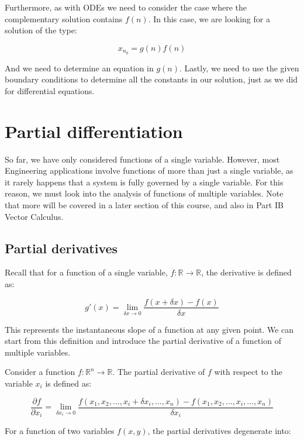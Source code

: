 \documentclass[12pt]{article}
\begin{document}
Furthermore, as with ODEs we need to consider the case where the complementary solution contains $f(n)$. In this case, we are looking for a solution of the type:

\[ x_{n_0} = g(n)f(n) \]

And we need to determine an equation in $g(n)$. Lastly, we need to use the given boundary conditions to determine all the constants in our solution, just as we did for differential equations.

\newpage

\section{Partial differentiation}

So far, we have only considered functions of a single variable. However, most Engineering applications involve functions of more than just a single variable, as it rarely happens that a system is fully governed by a single variable. For this reason, we must look into the analysis of functions of multiple variables. Note that more will be covered in a later section of this course, and also in Part IB Vector Calculus.

\subsection{Partial derivatives}

Recall that for a function of a single variable, $f : \mathbb{R} \to \mathbb{R}$, the derivative is defined as:

\[ g'(x) = \lim_{\delta x \to 0} \frac{f(x + \delta x) - f(x)}{\delta x} \]

This represents the instantaneous slope of a function at any given point. We can start from this definition and introduce the partial derivative of a function of multiple variables.

\begin{definition}
    Consider a function $f : \mathbb{R}^n \to \mathbb{R}$. The partial derivative of $f$ with respect to the variable $x_i$ is defined as:

    \[ \frac{\partial f}{\partial x_i} = \lim_{\delta x_i \to 0} \frac{f(x_1, x_2, \dots, x_i + \delta x_i, \dots, x_n) - f(x_1, x_2, \dots, x_i, \dots, x_n)}{\delta x_i} \]
\end{definition}

For a function of two variables $f(x, y)$, the partial derivatives degenerate into:
\end{document}
